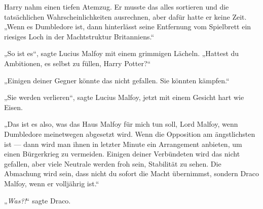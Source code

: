 Harry nahm einen tiefen Atemzug. Er musste das alles sortieren und die tatsächlichen Wahrscheinlichkeiten ausrechnen, aber dafür hatte er keine Zeit.
„Wenn es Dumbledore ist, dann hinterlässt seine Entfernung vom Spielbrett ein riesiges Loch in der Machtstruktur Britanniens.“

„So ist es“, sagte Lucius Malfoy mit einem grimmigen Lächeln.
„Hattest du Ambitionen, es selbst zu füllen, Harry Potter?“

„Einigen deiner Gegner könnte das nicht gefallen. Sie könnten kämpfen.“

„Sie werden verlieren“, sagte Lucius Malfoy, jetzt mit einem Gesicht hart wie Eisen.

„Das ist es also, was das Haus Malfoy für mich tun soll, Lord Malfoy, wenn Dumbledore meinetwegen abgesetzt wird. Wenn die Opposition am ängstlichsten ist — dann wird man ihnen in letzter Minute ein Arrangement anbieten, um einen Bürgerkrieg zu vermeiden. Einigen deiner Verbündeten wird das nicht gefallen, aber viele Neutrale werden froh sein, Stabilität zu sehen. Die Abmachung wird sein, dass nicht du sofort die Macht übernimmst, sondern Draco Malfoy, wenn er volljährig ist.“

„\emph{Was?!}“ sagte Draco.

